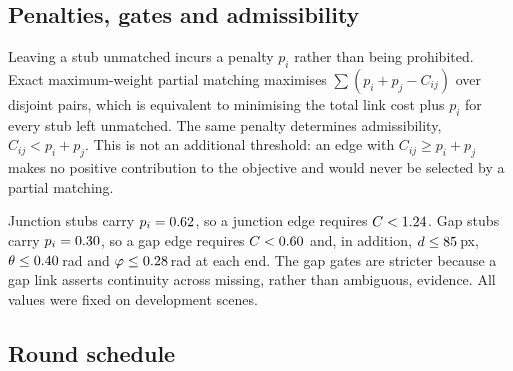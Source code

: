 \begin{table}[tbp]
  \centering
  \caption{Cost weights and scales of the released configuration. Junction
  and gap links are scored with separate sets; only the gap set includes a
  length term.}
  \label{tab:cost-weights}
  
\end{table}

\subsection{Penalties, gates and admissibility}

Leaving a stub unmatched incurs a penalty $p_i$ rather than being prohibited.
Exact maximum-weight partial matching maximises $\sum(p_i+p_j-C_{ij})$ over
disjoint pairs, which is equivalent to minimising the total link cost plus
$p_i$ for every stub left unmatched. The same penalty determines
admissibility, $C_{ij}<p_i+p_j$. This is not an additional threshold: an edge
with $C_{ij}\ge p_i+p_j$ makes no positive contribution to the objective and
would never be selected by a partial matching.

Junction stubs carry $p_i=0.62{}$, so a junction edge
requires $C<1.24{}$. Gap stubs carry
$p_i=0.30{}$, so a gap edge requires $C<0.60{}$
and, in addition, $d\le85{}$\,px,
$\theta\le0.40{}$\,rad and
$\varphi\le0.28{}$\,rad at each end. The gap gates are
stricter because a gap link asserts continuity across missing, rather than
ambiguous, evidence. All values were fixed on development scenes.

\subsection{Round schedule}

